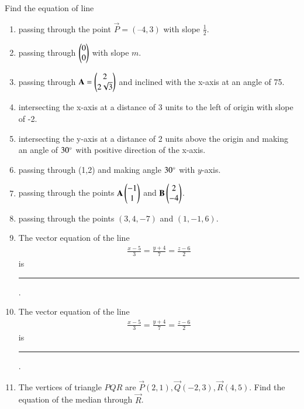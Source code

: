 Find the equation of line 
\begin{enumerate}[label=\thesubsection.\arabic*,ref=\thesubsection.\theenumi]
	\item passing through the point $\vec{P} = (– 4, 3)$ with slope $\frac{1}{2}$.
\label{chapters/11/10/2/2}
\\
\solution

	\item passing through $\begin{pmatrix}0\\0\end{pmatrix}$ with slope $m$.\\
\label{chapters/11/10/2/3}
\solution

    \item passing through 
    $\mathbf{A} = \begin{pmatrix}2\\2\sqrt{3}\end{pmatrix}$ and inclined with the x-axis at an angle 
    of 75\textdegree.
\label{chapters/11/10/2/4}
\\
    \solution 

\item intersecting the x-axis at a distance of 3 units to the left of origin with slope of -2.
\label{chapters/11/10/2/5}
\\
\solution 

\item intersecting the y-axis at a distance of 2 units above the origin and making an
angle of $30\degree$ with positive direction of the x-axis.
\\
\solution 

\item passing through (1,2) and making angle $30\degree$ with $y$-axis.
\item passing through the points $\mathbf{A}\begin{pmatrix}-1\\1\end{pmatrix}$ and $\mathbf{B}\begin{pmatrix}2\\-4\end{pmatrix}$.
\label{chapters/11/10/2/7}
\\
\solution 

\item passing through the points $(3,4,-7)$ and $(1,-1,6)$. 
\item The vector equation of the line 
\begin{align*}
	\frac{x-5}{3}=\frac{y+4}{7}=\frac{z-6}{2} 
\end{align*}
is \noindent\rule{2cm}{0.4pt}. 
\item The vector equation of the line 
\begin{align*}
	\frac{x-5}{3}=\frac{y+4}{7}=\frac{z-6}{2}
\end{align*}
 is \noindent\rule{2cm}{0.4pt}.
\item 
The vertices of triangle $PQR$ are $\vec{P}(2,1), \vec{Q}(-2,3), \vec{R}(4,5)$. Find the equation of the median through $\vec{R}$.

\end{enumerate}
